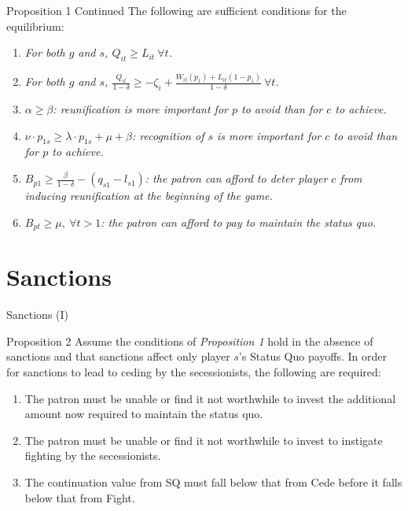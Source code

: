 \documentclass{beamer}
\begin{document}
\begin{frame}{Proposition 1 Continued}
\pause
  The following are sufficient conditions for the equilibrium:
	\begin{enumerate}[<+->]
		\item \textit{For both $g$ and $s$, $Q_{it} \geq L_{it} \ \forall t$.}

		\item \emph{For both $g$ and $s$, $\frac {Q_{it}}{1-\delta} \geq  -\zeta_i+\frac{W_{it}(p_1) + L_{it}(1-p_1)}{1-\delta} \ \forall t$.}

\item \textit{$\alpha \geq \beta$: reunification is more important for $p$ to avoid than for $c$ to achieve.}

\item  \textit{$\nu\cdot p_{1s} \geq \lambda \cdot p_{1s} + \mu + \beta$: recognition of $s$ is more important for $c$ to avoid than for $p$ to achieve.}

\item  \textit{$B_{p1} \geq\frac{\beta}{1-\delta} - \left(q_{s1} - l_{s1} \right)$: the patron can afford to deter player $c$ from inducing reunification at the beginning of the game.}

\item \textit{$B_{pt} \geq \mu, \ \forall t>1$: the patron can afford to pay to maintain the status quo.}
	\end{enumerate}
\end{frame}

\section{Sanctions}
\begin{frame}{Sanctions (I)}
\begin{beamerboxesrounded}[upper=palette tertiary, shadow=true]{Proposition 2}
  Assume the conditions of \emph{Proposition 1} hold in the absence of sanctions and that sanctions affect only player $s$'s Status Quo payoffs. In order for sanctions to lead to ceding by the secessionists, the following are required:
	\pause
	\begin{enumerate}[<+->]
\item The patron must be unable or find it not worthwhile to invest the additional amount now required to maintain the status quo.

\item The patron must be unable or find it not worthwhile to invest to instigate fighting by the secessionists.

\item The continuation value from SQ must fall below that from Cede before it falls below that from Fight.
\end{enumerate}

\end{beamerboxesrounded}

\end{frame}
\end{document}
